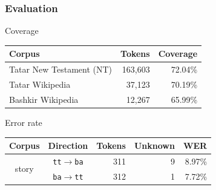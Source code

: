\documentclass[10pt,xetex]{beamer} %
\begin{document}
\begin{frame}
  \frametitle{Evaluation}

\begin{block}{Coverage}

\begin{center}
  \begin{tabular}{lrr}
  \hline
   {\bf Corpus}             & {\bf Tokens}    & {\bf Coverage}\\
  \hline
   Tatar New Testament (NT) & 163,603   & 72.04\% \\
   Tatar Wikipedia          & 37,123    & 70.19\% \\
  \hline
   Bashkir Wikipedia        & 12,267    & 65.99\% \\
  \hline
  \end{tabular}

\end{center}
\end{block}

\begin{block}{Error rate}
\begin{center}

  \begin{tabular}{ccrrr} %
  \hline
   {\bf Corpus}           & {\bf Direction}   & {\bf Tokens}  & {\bf Unknown} & {\bf WER}  \\
  \hline
   \multirow{2}{*}{story} & {\small {\tt tt$\rightarrow$ba}} & 311     & 9  & 8.97\% \\
                          & {\small {\tt ba$\rightarrow$tt}} & 312     & 1  & 7.72\%  \\
  \hline
  \end{tabular}
\end{center}
\end{block}

\end{frame}
\end{document}
